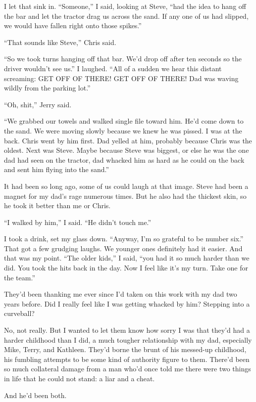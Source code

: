 \documentclass[12pt]{book}
\begin{document}
I let that sink in. ``Someone,'' I said, looking at Steve, ``had the idea to hang off the bar and let the tractor drag us across the sand. If any one of us had slipped, we would have fallen right onto those spikes.''

``That sounds like Steve,'' Chris said.

``So we took turns hanging off that bar. We'd drop off after ten seconds so the driver wouldn't see us.'' I laughed. ``All of a sudden we hear this distant screaming: GET OFF OF THERE! GET OFF OF THERE! Dad was waving wildly from the parking lot.''

``Oh, shit,'' Jerry said.

``We grabbed our towels and walked single file toward him. He'd come down to the sand. We were moving slowly because we knew he was pissed. I was at the back. Chris went by him first. Dad yelled at him, probably because Chris was the oldest. Next was Steve. Maybe because Steve was biggest, or else he was the one dad had seen on the tractor, dad whacked him as hard as he could on the back and sent him flying into the sand.''

It had been so long ago, some of us could laugh at that image. Steve had been a magnet for my dad's rage numerous times. But he also had the thickest skin, so he took it better than me or Chris.

``I walked by him,'' I said. ``He didn't touch me.''

I took a drink, set my glass down. ``Anyway, I'm so grateful to be number six.'' That got a few grudging laughs. We younger ones definitely had it easier. And that was my point. ``The older kids,'' I said, ``you had it so much harder than we did. You took the hits back in the day. Now I feel like it's my turn. Take one for the team.''

They'd been thanking me ever since I'd taken on this work with my dad two years before. Did I really feel like I was getting whacked by him? Stepping into a curveball?

No, not really. But I wanted to let them know how sorry I was that they'd had a harder childhood than I did, a much tougher relationship with my dad, especially Mike, Terry, and Kathleen. They'd borne the brunt of his messed-up childhood, his fumbling attempts to be some kind of authority figure to them. There'd been so much collateral damage from a man who'd once told me there were two things in life that he could not stand: a liar and a cheat.

And he'd been both.
\end{document}

